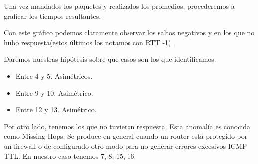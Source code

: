 Una vez mandados los paquetes y realizados los promedios, procederemos a graficar los tiempos resultantes.



Con este gráfico podemos claramente observar los saltos negativos y en los que no hubo respuesta(estos
últimos los notamos con RTT -1).



Daremos nuestras hipótesis sobre que casos son los que identificamos.

\begin{itemize}
\item Entre 4 y 5. Asimétricos.
\item Entre 9 y 10. Asimétrico.
\item Entre 12 y 13. Asimétrico.
\end{itemize}

Por otro lado, tenemos los que no tuvieron respuesta. Esta anomalía es conocida como Missing Hops.
Se produce en general cuando un router está protegido por un firewall o de configurado otro modo para no
generar errores excesivos ICMP TTL. En nuestro caso tenemos 7, 8, 15, 16.

